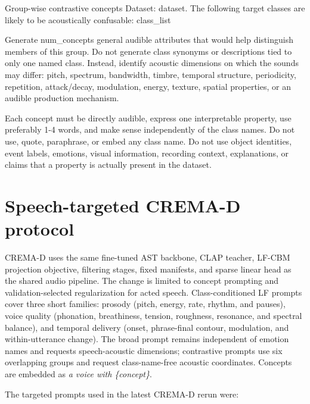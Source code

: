 \documentclass[10pt]{article}
\begin{document}
\begin{prompt}{Group-wise contrastive concepts}
Dataset: {dataset}.
The following target classes are likely to be acoustically confusable:
{class_list}

Generate {num_concepts} general audible attributes that would help distinguish members of this group. Do not generate class synonyms or descriptions tied to only one named class. Instead, identify acoustic dimensions on which the sounds may differ: pitch, spectrum, bandwidth, timbre, temporal structure, periodicity, repetition, attack/decay, modulation, energy, texture, spatial properties, or an audible production mechanism.

Each concept must be directly audible, express one interpretable property, use preferably 1-4 words, and make sense independently of the class names. Do not use, quote, paraphrase, or embed any class name. Do not use object identities, event labels, emotions, visual information, recording context, explanations, or claims that a property is actually present in the dataset.
\end{prompt}

\section{Speech-targeted CREMA-D protocol}
\label{app:cremad-targeted}
CREMA-D uses the same fine-tuned AST backbone, CLAP teacher, LF-CBM projection objective, filtering stages, fixed manifests, and sparse linear head as the shared audio pipeline. The change is limited to concept prompting and validation-selected regularization for acted speech. Class-conditioned LF prompts cover three short families: prosody (pitch, energy, rate, rhythm, and pauses), voice quality (phonation, breathiness, tension, roughness, resonance, and spectral balance), and temporal delivery (onset, phrase-final contour, modulation, and within-utterance change). The broad prompt remains independent of emotion names and requests speech-acoustic dimensions; contrastive prompts use six overlapping groups and request class-name-free acoustic coordinates. Concepts are embedded as \emph{a voice with \{concept\}}.

The targeted prompts used in the latest CREMA-D rerun were:
\end{document}

